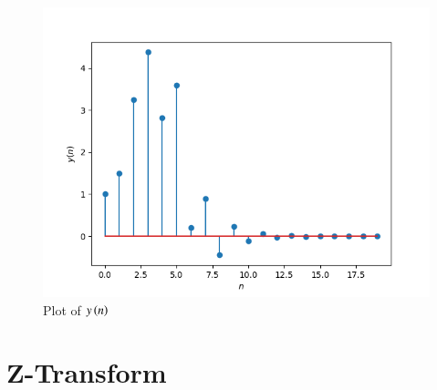 \documentclass[journal,12pt,twocolumn]{IEEEtran}
\theoremstyle{remark}
\begin{document}
\begin{enumerate}[label=\thesection.\arabic*,ref=\thesection.\theenumi]
\begin{figure}[ht]
    \includegraphics[width=0.8\columnwidth]{figs/y_n.png}
    \caption{Plot of $y\left(n\right)$}
\end{figure}
\end{enumerate}

\section{Z-Transform}
\end{document}
